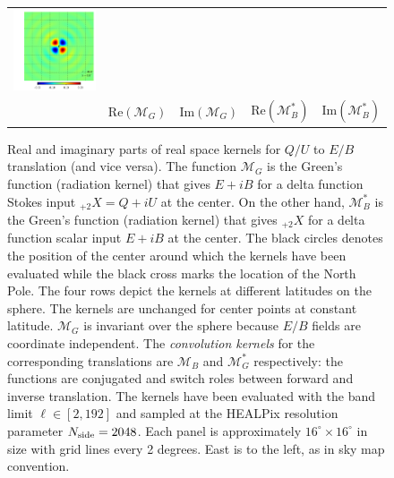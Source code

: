 \documentclass[a4paper,11pt]{article}
\begin{document}
\begin{figure}[t]
\begin{center}
\begin{tabular}{m{8ex}m{}m{}|m{}m{}}
\hspace{\kernelfigspace}\includegraphics[width=\kernelfigwidth]{qu2eb_iker_con_lat0_lon90.pdf} \\
&
\centering $ \textrm{Re} \left(\mathcal{M}_{G} \right) $ &
\centering $\textrm{Im} \left(\mathcal{M}_{G} \right) $ &
\centering $\textrm{Re}  \left(\mathcal{M}_{B}^* \right) $ &
\centering $\textrm{Im} \left(\mathcal{M}_{B}^* \right) $
\end{tabular}
\end{center}
\caption{Real and imaginary parts of real space kernels for $Q/U$ to $E/B$ translation (and vice versa).  The function $\mathcal{M}_{G}$ is the Green's function (radiation kernel) that gives $E+iB$ for a delta function Stokes input $_{+2}X = Q+iU$ at the center.  On the other hand, $\mathcal{M}^*_{B}$ is the Green's function (radiation kernel) that gives $_{+2}X$ for a delta function scalar input $E+iB$ at the center.  The black circles denotes the position of the center around which the kernels have been evaluated while the black cross marks the location of the North Pole. The four rows depict the kernels at different latitudes on the sphere.   The kernels are unchanged for center points at constant latitude.  $\mathcal{M}_G$ is invariant over the sphere because $E/B$ fields are coordinate independent. The \textit{convolution kernels} for the corresponding translations are $\mathcal{M}_B$ and $\mathcal{M}_G^*$ respectively: the functions are conjugated and switch roles between forward and inverse translation. The kernels have been evaluated with the band limit $\ell \in [2,192]$ and sampled at the HEALPix resolution parameter $N_{\rm side}=2048$. Each panel is approximately $16^{\circ} \times 16^{\circ}$ in size with grid lines every 2 degrees. East is to the left, as in sky map convention.} \label{fig:vis_kernel} 
\end{figure}
\end{document}
